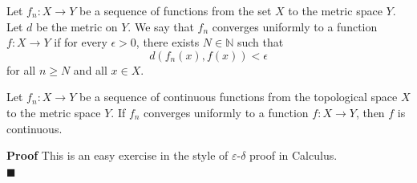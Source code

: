 \documentclass[main.tex]{subfiles}
\begin{document}
\begin{definition}
    Let $f_n: X \rightarrow Y$ be a sequence of functions from the set $X$ to the metric space $Y$. Let $d$ be the metric on $Y$. We say that $f_n$ converges uniformly to a function $f: X \rightarrow Y$ if for every $\epsilon > 0$, there exists $N \in \mathbb{N}$ such that 
    \begin{equation}
        d(f_n(x), f(x)) < \epsilon
    \end{equation}
    for all $n \geq N$ and all $x \in X$. 
\end{definition} 

\begin{theorem}
    Let $f_n: X \rightarrow Y$ be a sequence of continuous functions from the topological space $X$ to the metric space $Y$. If $f_n$ converges uniformly to a function $f: X \rightarrow Y$, then $f$ is continuous.
\end{theorem}
\par \noindent \textbf{Proof} This is an easy exercise in the style of $\varepsilon$-$\delta$ proof in Calculus. 
\mbox{} \\ \null \hfill $\blacksquare$
\end{document}

